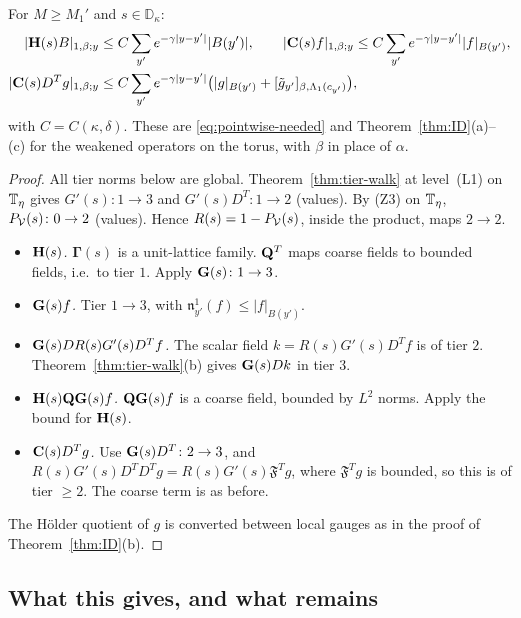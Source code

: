 \begin{theorem}\label{thm:HC-pointwise}
For $M\ge M_1'$ and $s\in\mathbb D_\kappa$:
\[
\begin{aligned}
|\mathbf H(s)B|_{1,\beta;y}&\le C\sum_{y'}e^{-\gamma|y-y'|}|B(y')|,\qquad|\mathbf C(s)f|_{1,\beta;y}\le C\sum_{y'}e^{-\gamma|y-y'|}|f|_{B(y')},\\
|\mathbf C(s)D^Tg|_{1,\beta;y}&\le C\sum_{y'}e^{-\gamma|y-y'|}\big(|g|_{B(y')}+[\tilde g_{y'}]_{\beta,\Lambda_1(c_{y'})}\big),
\end{aligned}
\]
with $C=C(\kappa,\delta)$. These are \eqref{eq:pointwise-needed} and Theorem~\ref{thm:ID}(a)--(c) for the weakened operators on the torus, with $\beta$ in place of $\alpha$.
\end{theorem}

\begin{proof}
All tier norms below are global. Theorem~\ref{thm:tier-walk} at level~(L1) on $\mathbb T_\eta$ gives $G'(s)\colon1\to3$ and $G'(s)D^T\colon1\to2$ (values). By (Z3) on $\mathbb T_\eta$, $P_\mathcal V(s)\colon0\to2$ (values). Hence $R(s)=1-P_\mathcal V(s)$, inside the product, maps $2\to2$.
\begin{itemize}
\item \emph{$\mathbf H(s)$.} $\boldsymbol\Gamma(s)$ is a unit-lattice family. $\mathbf Q^T$ maps coarse fields to bounded fields, i.e.\ to tier $1$. Apply $\mathbf G(s)\colon1\to3$.
\item \emph{$\mathbf G(s)f$.} Tier $1\to3$, with $\mathfrak n^1_{y'}(f)\le|f|_{B(y')}$.
\item \emph{$\mathbf G(s)DR(s)G'(s)D^Tf$.} The scalar field $k=R(s)G'(s)D^Tf$ is of tier $2$. Theorem~\ref{thm:tier-walk}(b) gives $\mathbf G(s)Dk$ in tier $3$.
\item \emph{$\mathbf H(s)\mathbf Q\mathbf G(s)f$.} $\mathbf Q\mathbf G(s)f$ is a coarse field, bounded by $L^2$ norms. Apply the bound for $\mathbf H(s)$.
\item \emph{$\mathbf C(s)D^Tg$.} Use $\mathbf G(s)D^T\colon2\to3$, and $R(s)G'(s)D^TD^Tg=R(s)G'(s)\mathfrak F^Tg$, where $\mathfrak F^Tg$ is bounded, so this is of tier $\ge2$. The coarse term is as before.
\end{itemize}
The H\"older quotient of $g$ is converted between local gauges as in the proof of Theorem~\ref{thm:ID}(b).
\end{proof}

\subsection{What this gives, and what remains}

